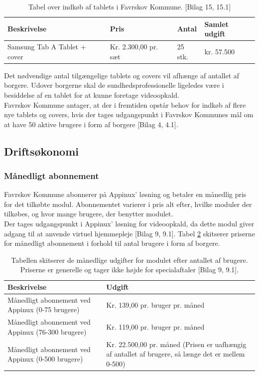 \begin{table}[H]
	\caption{Tabel over indkøb af tablets i Favrskov Kommune. [Bilag 15, 15.1]}
	\centering
	\label{tab:tabelindkoeb}
	\begin{tabular}{|l|l|l|l|}
		\hline
		\textbf{Beskrivelse} & \textbf{Pris} & \textbf{Antal} & \textbf{Samlet udgift}\\ \hline
		Samsung Tab A Tablet + cover & Kr. 2.300,00 pr. sæt & 25 stk. & kr. 57.500\\ \hline
	\end{tabular}
\end{table}
Det nødvendige antal tilgængelige tablets og covers vil afhænge af antallet af borgere. Udover borgerne skal de sundhedsprofessionelle ligeledes være i besiddelse af en tablet for at kunne foretage videoopkald. \\
Favrskov Kommune antager, at der i fremtiden opstår behov for indkøb af flere nye tablets og covers, hvis der tages udgangspunkt i Favrskov Kommunes mål om at have 50 aktive brugere i form af borgere [Bilag 4, 4.1].

\subsection{Driftsøkonomi}
\subsubsection{Månedligt abonnement}
Favrskov Kommune abonnerer på Appinux’ løsning og betaler en månedlig pris for det tilkøbte modul. Abonnementet varierer i pris alt efter, hvilke moduler der tilkøbes, og hvor mange brugere, der benytter modulet. \\
Der tages udgangspunkt i Appinux’ løsning for videoopkald, da dette modul giver adgang til at anvende virtuel hjemmepleje [Bilag 9, 9.1]. Tabel \ref{tab:tabelmaanedudgift} skitserer priserne for månedligt abonnement i forhold til antal brugere i form af borgere. 

\begin{table}[H]
	\caption{Tabellen skitserer de månedlige udgifter for modulet efter antallet af brugere. Priserne er generelle og tager ikke højde for specialaftaler [Bilag 9, 9.1].}
	\centering
	\label{tab:tabelmaanedudgift}
	\begin{tabularx}{\textwidth}{|X|X|}
		\hline
		\textbf{Beskrivelse} & \textbf{Udgift}\\ \hline
		Månedligt abonnement ved Appinux 
		(0-75 brugere)
		 & Kr. 139,00 pr. bruger pr. måned\\ 
		\hline
		Månedligt abonnement ved Appinux 
		(76-300 brugere)
		& Kr. 119,00 pr. bruger pr. måned\\ \hline
				Månedligt abonnement ved Appinux 
				(0-500 brugere)
				& Kr. 22.500,00 pr. måned (Prisen er uafhængig af antallet af brugere, så længe det er mellem 0-500)\\ \hline
	\end{tabularx}
\end{table}

